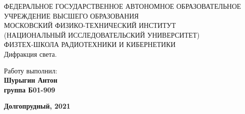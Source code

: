 \begin{center}
    {\small ФЕДЕРАЛЬНОЕ ГОСУДАРСТВЕННОЕ АВТОНОМНОЕ ОБРАЗОВАТЕЛЬНОЕ\\ УЧРЕЖДЕНИЕ ВЫСШЕГО ОБРАЗОВАНИЯ\\ МОСКОВСКИЙ ФИЗИКО-ТЕХНИЧЕСКИЙ ИНСТИТУТ\\ (НАЦИОНАЛЬНЫЙ ИССЛЕДОВАТЕЛЬСКИЙ УНИВЕРСИТЕТ)\\ ФИЗТЕХ-ШКОЛА РАДИОТЕХНИКИ И КИБЕРНЕТИКИ}\\
    \hfill \break
    \hfill \break
    \hfill \break
    \Huge{Дифракция света.}\\
\end{center}
  
  \hfill \break
  \hfill \break
  \hfill \break
  \hfill \break
  \hfill \break
  \hfill \break
  
  \begin{flushright}
    \normalsize{Работу выполнил:}\\
    \normalsize{\textbf{Шурыгин Антон \\группа Б01-909}} \\
  \end{flushright}
  
  \begin{center}
    \normalsize{\textbf{Долгопрудный, 2021}}
  \end{center}
  
  
  \thispagestyle{empty} %
  
  
  \newpage
  \thispagestyle{plain}
  \tableofcontents
  \thispagestyle{plain}
  \newpage